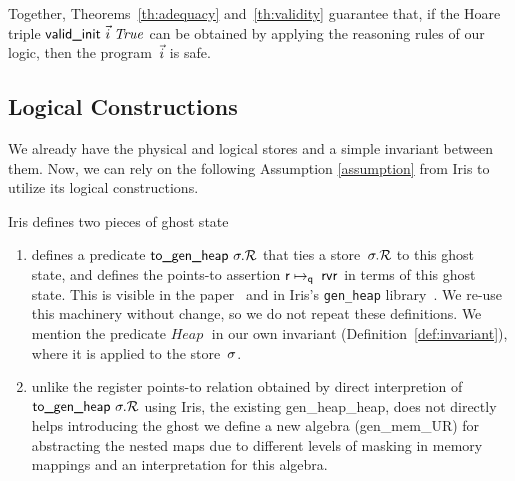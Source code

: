 Together, Theorems~\ref{th:adequacy} and~\ref{th:validity} guarantee that, if
the Hoare triple $\textsf{valid\_init }\vec{i}\;\mathit{True}$ can be obtained by applying
the reasoning rules of our logic, then the program~$\vec{i}$ is safe.

\subsection{Logical Constructions}
\label{sec:invariant}
We already have the physical and logical stores and a simple invariant between them. Now, we can rely on the following Assumption \ref{assumption} from Iris to utilize its logical constructions.
\newcommand{\genheapinterp}[1]{\mathit{Heap}\;#1}
\newcommand{\genmemheapinterp}[1]{\mathit{MemHeap}\;#1}
\newcommand{\pred}[1]{\ownGhost\gammaPred{\authfull{(\mapone\predstore)}}}
\newcommand{\mapone}[1]{1.#1}
\newcommand{\mapsfromexact}[3]{
  \ownGhost\gammaPred{\authfrag{\singletonMap{#1}{(#2, #3)}}}
}
\newcommand{\sh}{L'}
\newcommand{\mapsfromdef}[3]{
  \exists\sh.\;
  \mapsfromexact{#1}{#2}{\sh} \star \pure{\sh \subseteq #3}
}

\begin{assumption}
\label{assumption}
Iris defines two pieces of ghost state
\begin{enumerate}
\item  defines a predicate $\textsf{to\_gen\_heap }\sigma.\mathcal{R}$
  that ties a store~$\sigma.\mathcal{R}$ to this ghost state,
  and defines the points-to assertion $\mathsf{r}\mapsto_{\mathsf{q}}\;\mathsf{rv}\mathsf{r}$
  in terms of this ghost state.
  This is visible in the paper~\cite[\S6.3.2]{iris}
  and in Iris's \texttt{gen\_heap} library~\cite{genheap}.
  We re-use this machinery without change,
  so we do not repeat these definitions.
  We mention the predicate $\genheapinterp\!$
  in our own invariant (Definition~\ref{def:invariant}),
  where it is applied to the \logical store~$\sigma$.
\item unlike the register points-to relation obtained by direct interpretion of $\textsf{to\_gen\_heap }\sigma.\mathcal{R}$ using Iris, the existing \textsf{gen\_heap\_heap},
  does not directly helps introducing the ghost we define a new algebra (\textsf{gen\_mem\_UR}) for abstracting the nested maps due to different levels of masking in memory mappings and an interpretation for this algebra. 
\end{enumerate}
\end{assumption}

